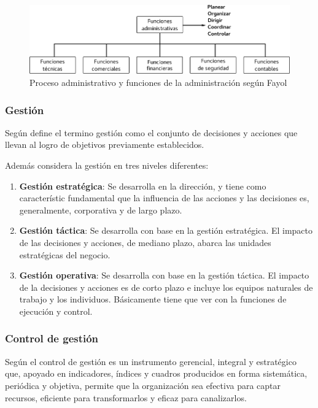 \begin{figure}[h]
    \centering
    \captionsetup{justification=centering}
    \includegraphics[width=1.0\textwidth]{Imagenes/Bitmap/funciones_adm}
    \caption{Proceso administrativo y funciones de la administración según Fayol}
    \label{fig:adm}
\end{figure}

\subsubsection{Gestión}
Según \cite{beltran} define el termino gestión como el conjunto de decisiones
y acciones que llevan al logro de objetivos previamente establecidos.

Además \cite{beltran} considera la gestión en tres niveles diferentes:
\begin{enumerate}
    \item \textbf{Gestión estratégica}: Se desarrolla en la dirección, y tiene como
          característic fundamental que la influencia de las acciones y las decisiones
          es, generalmente, corporativa y de largo plazo.
    \item \textbf{Gestión táctica}: Se desarrolla con base en la gestión
          estratégica. El impacto de las decisiones y acciones, de mediano plazo,
          abarca las unidades estratégicas del negocio.
    \item \textbf{Gestión operativa}: Se desarrolla con base en la gestión
          táctica. El impacto de la decisiones y acciones es de corto plazo e incluye
          los equipos naturales de trabajo y los individuos. Básicamente tiene
          que ver con la funciones de ejecución y control.
\end{enumerate}

\subsubsection{Control de gestión}
Según \cite{beltran} el control de gestión es un instrumento gerencial, integral
y estratégico que, apoyado en indicadores, índices y cuadros producidos en forma
sistemática, periódica y objetiva, permite que la organización sea efectiva para
captar recursos, eficiente para transformarlos y eficaz para canalizarlos.

